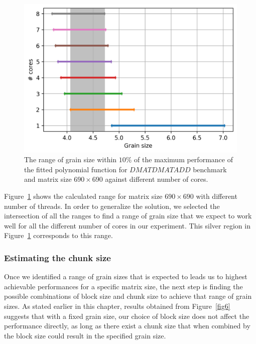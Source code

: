 \begin{figure}[H]
	\centering
	\includegraphics[scale=.75]{images/polyfit/fig_690_peak_range_silver.png}
	\caption{The range of grain size within $10\%$ of the maximum performance of the fitted polynomial function for $DMATDMATADD$ benchmark and matrix size $690\times690$ against different number of cores.}	
	\label{fig13}
\end{figure}



Figure~\ref{fig13} shows the calculated range for matrix size $690\times690$ with different number of threads. In order to generalize the solution, we selected the intersection of all the ranges to find a range of grain size that we expect to work well for all the different number of cores in our experiment. This silver region in Figure~\ref{fig13} corresponds to this range. 
\vspace{\baselineskip}	

\subsubsection{Estimating the chunk size}
Once we identified a range of grain sizes that is expected to leads us to highest achievable performances for a specific matrix size, the next step is finding the possible combinations of block size and chunk size to achieve that range of grain sizes.  
As stated earlier in this chapter, results obtained from Figure~\ref{fig6} suggests that with a fixed grain size, our choice of block size does not affect the performance directly, as long as there exist a chunk size that when combined by the block size could result in the specified grain size. 

